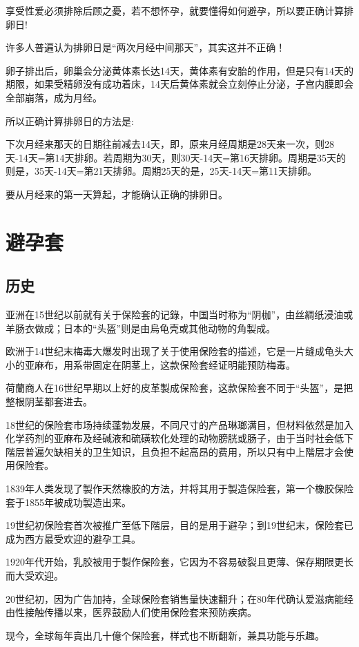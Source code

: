 \documentclass[12pt,UTF8]{ctexbook}
\begin{document}
享受性爱必须排除后顾之憂，若不想怀孕，就要懂得如何避孕，所以要正确计算排卵日!

许多人普遍认为排卵日是“两次月经中间那天”，其实这并不正确！

卵子排出后，卵巢会分泌黄体素长达14天，黄体素有安胎的作用，但是只有14天的期限，如果受精卵没有成功着床，14天后黄体素就会立刻停止分泌，子宫内膜即会全部崩落，成为月经。

所以正确计算排卵日的方法是:

下次月经来那天的日期往前减去14天，即，原来月经周期是28天来一次，则28天-14天=第14天排卵。若周期为30天，则30天-14天=第16天排卵。周期是35天的则是，35天-14天=第21天排卵。周期25天的是，25天-14天=第11天排卵。

要从月经来的第一天算起，才能确认正确的排卵日。

\section{避孕套}

\subsection{历史}

亚洲在15世纪以前就有关于保险套的记錄，中国当时称为“阴枷”，由丝綢纸浸油或羊肠衣做成；日本的“头盔”则是由烏龟壳或其他动物的角製成。

欧洲于14世纪末梅毒大爆发时出现了关于使用保险套的描述，它是一片缝成龟头大小的亚麻布，用系带固定在阴茎上，这款保险套经证明能预防梅毒。

荷蘭商人在16世纪早期以上好的皮革製成保险套，这款保险套不同于“头盔”，是把整根阴茎都套进去。

18世纪的保险套市场持续蓬勃发展，不同尺寸的产品琳瑯满目，但材料依然是加入化学药剂的亚麻布及经碱液和硫磺软化处理的动物膀胱或肠子，由于当时社会低下階层普遍欠缺相关的卫生知识，且负担不起高昂的费用，所以只有中上階层才会使用保险套。

1839年人类发现了製作天然橡胶的方法，并将其用于製造保险套，第一个橡胶保险套于1855年被成功製造出来。

19世纪初保险套首次被推广至低下階层，目的是用于避孕；到19世纪末，保险套已成为西方最受欢迎的避孕工具。

1920年代开始，乳胶被用于製作保险套，它因为不容易破裂且更薄、保存期限更长而大受欢迎。

20世纪初，因为广告加持，全球保险套销售量快速翻升；在80年代确认爱滋病能经由性接触传播以来，医界鼓励人们使用保险套来预防疾病。

现今，全球每年賣出几十億个保险套，样式也不断翻新，兼具功能与乐趣。
\end{document}
